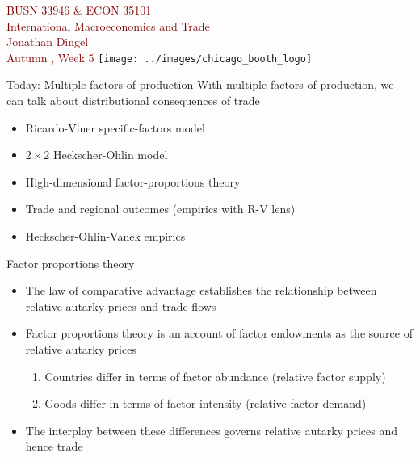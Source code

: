 \documentclass[10pt,notes=hide]{beamer}
\begin{document}
\begin{frame}[plain]
\begin{center}
\large
\textcolor{maroon}{BUSN 33946 \& ECON 35101\\
International Macroeconomics and Trade\\ 
Jonathan Dingel\\
Autumn \the\year, Week 5}
\vfill 
\texttt{[image: ../images/chicago\_booth\_logo]}
\end{center}
\end{frame}
\begin{frame}{Today: Multiple factors of production}
With multiple factors of production, we can talk about distributional consequences of trade
\begin{itemize}
	\item Ricardo-Viner specific-factors model
	\item $2 \times 2$ Heckscher-Ohlin model
	\item High-dimensional factor-proportions theory
	\item Trade and regional outcomes (empirics with R-V lens)
	\item Heckscher-Ohlin-Vanek empirics
\end{itemize}
\end{frame}
\begin{frame}{Factor proportions theory}
\begin{itemize}
	\item The law of comparative advantage establishes the relationship between relative autarky prices and trade flows
	\item Factor proportions theory is an account of factor endowments as the source of relative autarky prices
	\begin{enumerate}
		\item Countries differ in terms of factor abundance (relative factor supply)
		\item Goods differ in terms of factor intensity (relative factor demand)
	\end{enumerate}
	\item The interplay between these differences governs relative autarky prices and hence trade
\end{itemize}
\end{frame}
\end{document}

